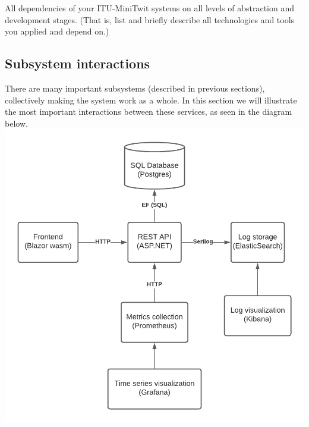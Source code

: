   All dependencies of your ITU-MiniTwit systems on all levels of abstraction and development stages. (That is, list and briefly describe all technologies and tools you applied and depend on.)
  
  \subsection{Subsystem interactions}
  There are many important subsystems (described in previous sections), collectively making the system work as a whole.
  In this section we will illustrate the most important interactions between these services, as seen in the diagram below.\newline
  \includegraphics{images/InteractionDiagram.png}
